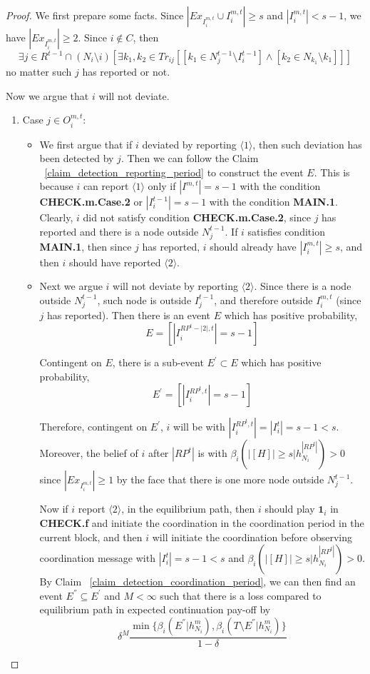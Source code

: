\documentclass[12pt]{article}
\theoremstyle{remark}
\theoremstyle{remark}
\begin{document}
\begin{proof}

We first prepare some facts. Since $|Ex_{I^{m,t}_i}\cup I^{m,t}_i|\geq s$ and $|I^{m,t}_i|<s-1$, we have $|Ex_{I^{m,t}_i}|\geq 2$. Since $i\notin C$, then
\[\exists j\in R^{t-1}\cap (N_i\setminus i)[\exists k_1,k_2\in Tr_{ij}[[k_1\in N^{t-1}_j\setminus I^{t-1}_i] \wedge [k_2\in N_{k_1}\setminus k_1]]]\]
no matter such $j$ has reported or not.

Now we argue that $i$ will not deviate.
\begin{enumerate}
\item Case $j\in O^{m,t}_i$: 

\begin{itemize}
\item We first argue that if $i$ deviated by reporting $\langle 1 \rangle$, then such deviation has been detected by $j$. Then we can follow the Claim ~\ref{claim_detection_reporting_period} to construct the event $E$. This is because $i$ can report $\langle 1 \rangle$ only if $|I^{m,t}|=s-1$ with the condition \textbf{CHECK.m.Case.2} or $|I^{t-1}_i|=s-1$ with the condition \textbf{MAIN.1}. Clearly, $i$ did not satisfy condition \textbf{CHECK.m.Case.2}, since $j$ has reported and there is a node outside $N^{t-1}_j$. If $i$ satisfies condition \textbf{MAIN.1}, then since $j$ has reported, $i$ should already have $|I^{m,t}_i|\geq s$, and then $i$ should have reported $\langle 2 \rangle$. 

\item Next we argue $i$ will not deviate by reporting $\langle 2 \rangle$. Since there is a node outside $N^{t-1}_j$, such node is outside $I^{t-1}_j$, and therefore outside $I^{m,t}_i$ (since $j$ has reported). Then there is an event $E$ which has positive probability,
\[E=[|I^{RP^t-|2|,t}_i|=s-1]\]

Contingent on $E$, there is a sub-event $E^{'}\subset E$ which has positive probability, 
\[E^{'}=[|I^{RP^t,t}_i|=s-1]\]

Therefore, contingent on $E^{'}$, $i$ will be with $|I^{RP^t,t}_i|=|I^{t}_i|=s-1<s$. Moreover, the belief of $i$ after $|RP^t|$ is with $\beta_{i}(|[H]|\geq s|h^{|RP^t|}_{N_i})>0$ since $|Ex_{I^{m,t}_i}|\geq 1$ by the face that there is one more node outside $N^{t-1}_j$. 

Now if $i$ report $\langle 2 \rangle$, in the equilibrium path, then $i$ should play $\mathbf{1}_i$ in \textbf{CHECK.f} and initiate the coordination in the coordination period in the current block, and then $i$ will initiate the coordination before observing coordination message with $|I^{t}_i|=s-1<s$ and $\beta_{i}(|[H]|\geq s|h^{|RP^t|}_{N_i})>0$. By Claim  ~\ref{claim_detection_coordination_period}, we can then find an event $E^{''}\subseteq E^{'}$ and $M<\infty$ such that there is a loss compared to equilibrium path in expected continuation pay-off by 
\[\delta^{M}\frac{\min\{\beta_{i}(E^{''}|h^{m}_{N_i}),\beta_{i}(T\setminus E^{''}|h^{m}_{N_i})\}}{1-\delta}\]
\end{itemize}


\end{enumerate}
\end{proof}
\end{document}
